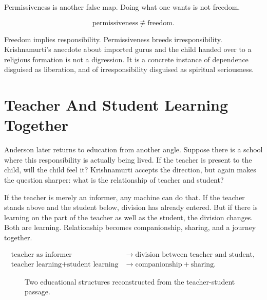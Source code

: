 Permissiveness is another false map. Doing what one wants is not freedom.

\begin{equation}
\text{permissiveness}
\not\equiv
\text{freedom}.
\end{equation}

Freedom implies responsibility. Permissiveness breeds irresponsibility. Krishnamurti's anecdote about imported gurus and the child handed over to a religious formation is not a digression. It is a concrete instance of dependence disguised as liberation, and of irresponsibility disguised as spiritual seriousness.

\section{Teacher And Student Learning Together}

Anderson later returns to education from another angle. Suppose there is a school where this responsibility is actually being lived. If the teacher is present to the child, will the child feel it? Krishnamurti accepts the direction, but again makes the question sharper: what is the relationship of teacher and student?

If the teacher is merely an informer, any machine can do that. If the teacher stands above and the student below, division has already entered. But if there is learning on the part of the teacher as well as the student, the division changes. Both are learning. Relationship becomes companionship, sharing, and a journey together.

\begin{align}
\text{teacher as informer}
&\longrightarrow \text{division between teacher and student}, \\
\text{teacher learning}+\text{student learning}
&\longrightarrow \text{companionship}+\text{sharing}.
\end{align}

\begin{figure}
\centering
{}
\caption{Two educational structures reconstructed from the teacher-student passage.}
\end{figure}

